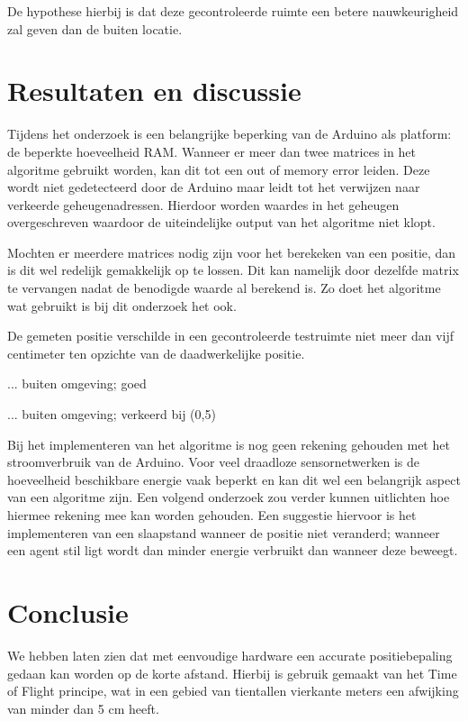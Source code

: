 \documentclass[a4paper,10pt]{article}
\begin{document}
De hypothese hierbij is dat deze gecontroleerde ruimte een betere nauwkeurigheid zal geven dan de buiten locatie.

\section{Resultaten en discussie}\label{sec:resultaten}
Tijdens het onderzoek is een belangrijke beperking van de Arduino als platform: de beperkte hoeveelheid RAM. Wanneer er meer dan twee matrices in het algoritme gebruikt worden, kan dit tot een out of memory error leiden. Deze wordt niet gedetecteerd door de Arduino maar leidt tot het verwijzen naar verkeerde geheugenadressen. Hierdoor worden waardes in het geheugen overgeschreven waardoor de uiteindelijke output van het algoritme niet klopt.

Mochten er meerdere matrices nodig zijn voor het berekeken van een positie, dan is dit wel redelijk gemakkelijk op te lossen. Dit kan namelijk door dezelfde matrix te vervangen nadat de benodigde waarde al berekend is. Zo doet het algoritme wat gebruikt is bij dit onderzoek het ook.

De gemeten positie verschilde in een gecontroleerde testruimte niet meer dan vijf centimeter ten opzichte van de daadwerkelijke positie.

... buiten omgeving; goed

... buiten omgeving; verkeerd bij (0,5)

Bij het implementeren van het algoritme is nog geen rekening gehouden met het stroomverbruik van de Arduino. Voor veel draadloze sensornetwerken is de hoeveelheid beschikbare energie vaak beperkt en kan dit wel een belangrijk aspect van een algoritme zijn. Een volgend onderzoek zou verder kunnen uitlichten hoe hiermee rekening mee kan worden gehouden. Een suggestie hiervoor is het implementeren van een slaapstand wanneer de positie niet veranderd; wanneer een agent stil ligt wordt dan minder energie verbruikt dan wanneer deze beweegt.

\section{Conclusie}\label{sec:conclusie}
We hebben laten zien dat met eenvoudige hardware een accurate positiebepaling gedaan kan worden op de korte afstand. Hierbij is gebruik gemaakt van het Time of Flight principe, wat in een gebied van tientallen vierkante meters een afwijking van minder dan 5 cm heeft.
\end{document}
